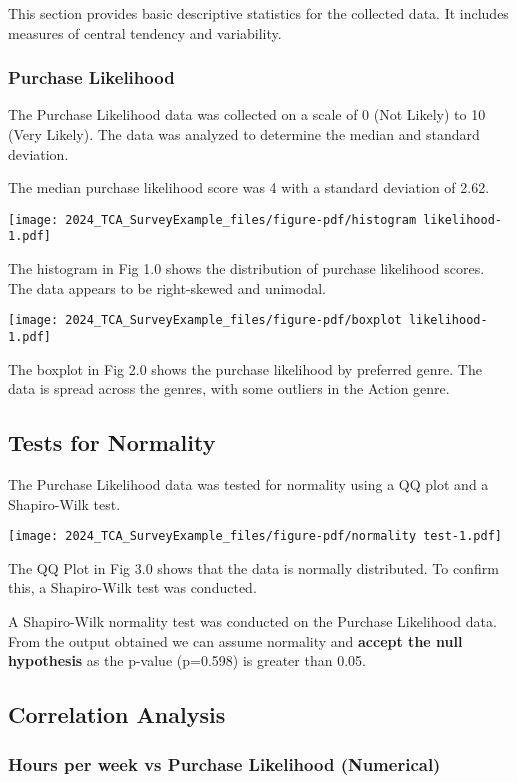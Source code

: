 \documentclass[
  letterpaper,
  DIV=11,
  numbers=noendperiod]{scrartcl}
\begin{document}
This section provides basic descriptive statistics for the collected
data. It includes measures of central tendency and variability.

\subsubsection{Purchase Likelihood}\label{purchase-likelihood}

The Purchase Likelihood data was collected on a scale of 0 (Not Likely)
to 10 (Very Likely). The data was analyzed to determine the median and
standard deviation.

The median purchase likelihood score was 4 with a standard deviation of
2.62.

\texttt{[image: 2024\_TCA\_SurveyExample\_files/figure-pdf/histogram likelihood-1.pdf]}

The histogram in Fig 1.0 shows the distribution of purchase likelihood
scores. The data appears to be right-skewed and unimodal.

\texttt{[image: 2024\_TCA\_SurveyExample\_files/figure-pdf/boxplot likelihood-1.pdf]}

The boxplot in Fig 2.0 shows the purchase likelihood by preferred genre.
The data is spread across the genres, with some outliers in the Action
genre.

\subsection{Tests for Normality}\label{tests-for-normality}

The Purchase Likelihood data was tested for normality using a QQ plot
and a Shapiro-Wilk test.

\texttt{[image: 2024\_TCA\_SurveyExample\_files/figure-pdf/normality test-1.pdf]}

The QQ Plot in Fig 3.0 shows that the data is normally distributed. To
confirm this, a Shapiro-Wilk test was conducted.

A Shapiro-Wilk normality test was conducted on the Purchase Likelihood
data. From the output obtained we can assume normality and
\textbf{accept the null hypothesis} as the p-value (p=0.598) is greater
than 0.05.

\subsection{Correlation Analysis}\label{correlation-analysis}

\subsubsection{Hours per week vs Purchase Likelihood
(Numerical)}\label{hours-per-week-vs-purchase-likelihood-numerical}
\end{document}
